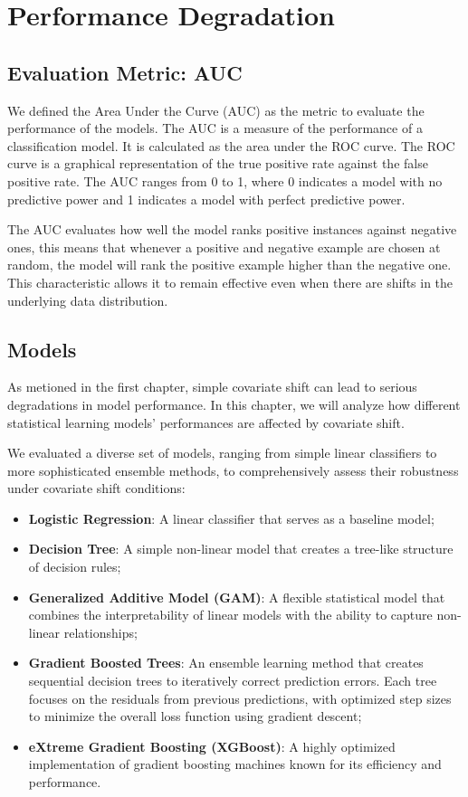 \chapter{Performance Degradation}

\section{Evaluation Metric: AUC}

We defined the Area Under the Curve (AUC) as the metric to evaluate the performance of the models. The AUC is a measure of the performance of a classification model.
It is calculated as the area under the ROC curve. The ROC curve is a graphical representation of the true positive rate against the false positive rate. The AUC ranges from 0 to 1, where 0 indicates a model with no predictive power and 1 indicates a model with perfect predictive power. 

The AUC evaluates how well the model ranks positive instances against negative ones, this means that whenever a positive and negative example are chosen at random, the model will rank the positive example higher than the negative one. This characteristic allows it to remain effective even when there are shifts in the underlying data distribution.

\section{Models}

As metioned in the first chapter, simple covariate shift can lead to serious degradations in model performance. In this chapter, we will analyze how different statistical learning models' performances are affected by covariate shift. 

We evaluated a diverse set of models, ranging from simple linear classifiers to more sophisticated ensemble methods, to comprehensively assess their robustness under covariate shift conditions:

\begin{itemize}
    \item \textbf{Logistic Regression}: A linear classifier that serves as a baseline model;
    \item \textbf{Decision Tree}: A simple non-linear model that creates a tree-like structure of decision rules;
    \item \textbf{Generalized Additive Model (GAM)}: A flexible statistical model that combines the interpretability of linear models with the ability to capture non-linear relationships;
    \item \textbf{Gradient Boosted Trees}: An ensemble learning method that creates sequential decision trees to iteratively correct prediction errors. Each tree focuses on the residuals from previous predictions, with optimized step sizes to minimize the overall loss function using gradient descent;
    \item \textbf{eXtreme Gradient Boosting (XGBoost)}: A highly optimized implementation of gradient boosting machines known for its efficiency and performance.
\end{itemize}


